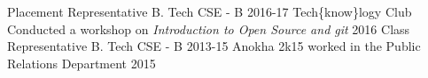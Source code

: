 \begin{cvhonors}
  \cvhonor
    {Placement Representative}
    {B. Tech CSE - B}
    {\empty}
    {2016-17}
  \cvhonor
    {Tech\{know\}logy Club}
    {Conducted a workshop on \textit{Introduction to Open Source and git}}
    {}
    {2016}
 \cvhonor
    {Class Representative}
    {B. Tech CSE - B}
    {\empty}
    {2013-15}
  \cvhonor
    {Anokha 2k15}
    {worked in the Public Relations Department}
    {}
    {2015}
\end{cvhonors}